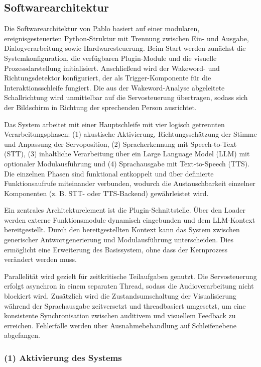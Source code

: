 \subsection{Softwarearchitektur}

Die Softwarearchitektur von Pablo basiert auf einer modularen, ereignisgesteuerten Python-Struktur mit Trennung zwischen Ein- und Ausgabe, Dialogverarbeitung sowie Hardwaresteuerung. 
Beim Start werden zunächst die Systemkonfiguration, die verfügbaren Plugin-Module und die visuelle Prozessdarstellung initialisiert. 
Anschließend wird der Wakeword- und Richtungsdetektor konfiguriert, der als Trigger-Komponente für die Interaktionsschleife fungiert.
Die aus der Wakeword-Analyse abgeleitete Schallrichtung wird unmittelbar auf die Servosteuerung übertragen, sodass sich der Bildschirm in Richtung der sprechenden Person ausrichtet.

Das System arbeitet mit einer Hauptschleife mit vier logisch getrennten Verarbeitungsphasen: 
(1) akustische Aktivierung, Richtungsschätzung der Stimme und Anpassung der Servoposition, 
(2) Spracherkennung mit Speech-to-Text (STT), 
(3) inhaltliche Verarbeitung über ein Large Language Model (LLM) mit optionaler Modulausführung und
(4) Sprachausgabe mit Text-to-Speech (TTS). 
Die einzelnen Phasen sind funktional entkoppelt und über definierte Funktionsaufrufe miteinander verbunden, wodurch die Austauschbarkeit einzelner Komponenten (z. B. STT- oder TTS-Backend) gewährleistet wird.

Ein zentrales Architekturelement ist die Plugin-Schnittstelle. Über den Loader werden externe Funktionsmodule dynamisch eingebunden und dem LLM-Kontext bereitgestellt. 
Durch den bereitgestellten Kontext kann das System zwischen generischer Antwortgenerierung und Modulausführung unterscheiden. 
Dies ermöglicht eine Erweiterung des Basissystem, ohne dass der Kernprozess verändert werden muss.

Parallelität wird gezielt für zeitkritische Teilaufgaben genutzt. 
Die Servosteuerung erfolgt asynchron in einem separaten Thread, sodass die Audioverarbeitung nicht blockiert wird. 
Zusätzlich wird die Zustandsumschaltung der Visualisierung während der Sprachausgabe zeitversetzt und threadbasiert umgesetzt, um eine konsistente Synchronisation zwischen auditivem und visuellem Feedback zu erreichen. 
Fehlerfälle werden über Ausnahmebehandlung auf Schleifenebene abgefangen. 

\subsubsection{(1) Aktivierung des Systems}

